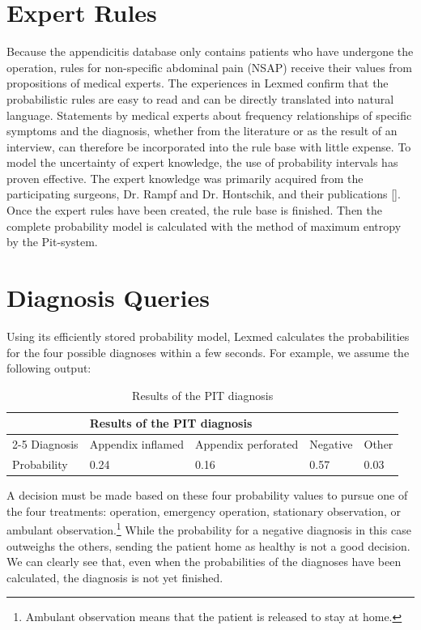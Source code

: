 \documentclass[10pt]{book}
\begin{document}
\section{Expert Rules}
Because the appendicitis database only contains patients who have undergone the operation, rules for non-specific abdominal pain (NSAP) receive their values from propositions of medical experts. The experiences in Lexmed confirm that the probabilistic rules are easy to read and can be directly translated into natural language. Statements by medical experts about frequency relationships of specific symptoms and the diagnosis, whether from the literature or as the result of an interview, can therefore be incorporated into the rule base with little expense. To model the uncertainty of expert knowledge, the use of probability intervals has proven effective. The expert knowledge was primarily acquired from the participating surgeons, Dr. Rampf and Dr. Hontschik, and their publications [\cite{hontschik1994appendektomie}].
Once the expert rules have been created, the rule base is finished. Then the complete probability model is calculated with the method of maximum entropy by the Pit-system.

\section{Diagnosis Queries}
Using its efficiently stored probability model, Lexmed calculates the probabilities for the four possible diagnoses within a few seconds. For example, we assume the following output:

\begin{table}[t]
\centering
\caption{Results of the PIT diagnosis}
\begin{tabular}{lllll}
\hline
 & \multicolumn{4}{l}{Results of the PIT diagnosis} \\
\cline{2-5}
Diagnosis & Appendix inflamed & Appendix perforated & Negative & Other \\
\hline
Probability & 0.24 & 0.16 & 0.57 & 0.03 \\
\hline
\end{tabular}
\end{table}

A decision must be made based on these four probability values to pursue one of the four treatments: operation, emergency operation, stationary observation, or ambulant observation.\footnote{Ambulant observation means that the patient is released to stay at home.} While the probability for a negative diagnosis in this case outweighs the others, sending the patient home as healthy is not a good decision. We can clearly see that, even when the probabilities of the diagnoses have been calculated, the diagnosis is not yet finished.
\end{document}
